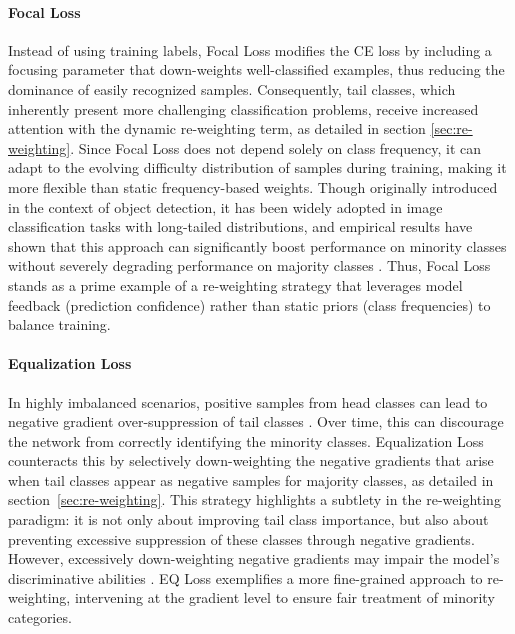 \paragraph{Focal Loss}
Instead of using training labels, Focal Loss \cite{lin2018focallossdenseobject} modifies the CE loss by including a focusing parameter that down-weights well-classified examples, thus reducing the dominance of easily recognized samples. Consequently, tail classes, which inherently present more challenging classification problems, receive increased attention with the dynamic re-weighting term, as detailed in section \ref{sec:re-weighting}. Since Focal Loss does not depend solely on class frequency, it can adapt to the evolving difficulty distribution of samples during training, making it more flexible than static frequency-based weights. Though originally introduced in the context of object detection, it has been widely adopted in image classification tasks with long-tailed distributions, and empirical results have shown that this approach can significantly boost performance on minority classes without severely degrading performance on majority classes \cite{lin2018focallossdenseobject,zhang2023deep}. Thus, Focal Loss stands as a prime example of a re-weighting strategy that leverages model feedback (prediction confidence) rather than static priors (class frequencies) to balance training.

\paragraph{Equalization Loss}
In highly imbalanced scenarios, positive samples from head classes can lead to negative gradient over-suppression of tail classes \cite{zhang2023deep}. Over time, this can discourage the network from correctly identifying the minority classes. Equalization Loss \cite{tan2020equalizationlosslongtailedobject} counteracts this by selectively down-weighting the negative gradients that arise when tail classes appear as negative samples for majority classes, as detailed in section~\ref{sec:re-weighting}. This strategy highlights a subtlety in the re-weighting paradigm: it is not only about improving tail class importance, but also about preventing excessive suppression of these classes through negative gradients. However, excessively down-weighting negative gradients may impair the model's discriminative abilities \cite{zhang2023deep}. EQ Loss exemplifies a more fine-grained approach to re-weighting, intervening at the gradient level to ensure fair treatment of minority categories. 

